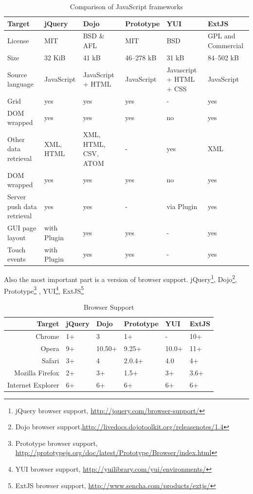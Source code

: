	\begin{table}[H]
	\centering
	\begin{tabular}{|L{3cm}|l|L{2cm}|l|L{2cm}|L{2cm}|}
	\hline
	Target 			& jQuery & Dojo & Prototype & YUI & ExtJS \\
	\hline
	\hline
	License		& MIT & BSD \& AFL & MIT & BSD & GPL and Commercial \\
	\hline
	Size		& 32 KiB & 41 kB & 46–278 kB & 31 kB & 84–502 kB \\
	\hline
	Source language		& JavaScript & JavaScript + HTML & JavaScript &  Javascript + HTML + CSS & JavaScript \\
	\hline
	Grid		& yes & yes & yes & - & yes  \\
	\hline
	DOM wrapped		& yes & yes & yes & no & yes \\
	\hline
	Other data retrieval		& XML, HTML & XML, HTML, CSV, ATOM & - & yes & XML  \\
	\hline
	DOM wrapped		& yes & yes & yes & no & yes \\
	\hline
	Server push data retrieval		& yes & yes & - & via Plugin & yes \\
	\hline
	GUI page layout		& with Plugin & yes & yes & - & yes \\
	\hline 		
	Touch events		& with Plugin & yes & yes & - & yes \\
	\hline 
	\end{tabular}
	\caption[Caption in TOC]{Comparison of JavaScript frameworks}
	\label{tab:JS_frameworks}
	\end{table}
	Also the most important part is a version of browser support. jQuery\footnote{jQuery browser support, \url{http://jquery.com/browser-support/}}, Dojo\footnote{Dojo browser support,\url{http://livedocs.dojotoolkit.org/releasenotes/1.4}}, Prototype\footnote{Prototype browser support, \url{http://prototypejs.org/doc/latest/Prototype/Browser/index.html}} , YUI\footnote{YUI browser support, \url{http://yuilibrary.com/yui/environments/}}, ExtJS\footnote{ExtJS browser support, \url{http://www.sencha.com/products/extjs/}}

	\begin{table}[H]
	\centering
	\begin{tabular}{|r|l|l|l|l|l|}
	\hline
	Target 			& jQuery & Dojo & Prototype & YUI & ExtJS \\
	\hline
	\hline
	Chrome		& 1+ & 3 & 1+ & - & 10+ \\
	\hline
	Opera		& 9+ & 10.50+ & 9.25+ & 10.0+ & 11+ \\
	\hline
	Safari		& 3+ & 4 & 2.0.4+ & 4.0 & 4+ \\
	\hline
	Mozilla Firefox		& 2+ & 3+ & 1.5+ & 3+ & 3.6+ \\
	\hline
	Internet Explorer		& 6+ & 6+ & 6+ & 6+ & 6+ \\
	\hline
	\end{tabular}
	\caption[Caption in TOC]{Browser Support}
	\label{tab:internal_results}
	\end{table}
    
